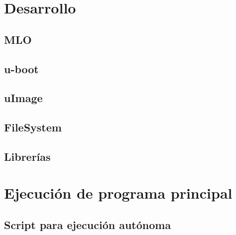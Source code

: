 \section{Desarrollo}
\subsection{MLO}
\subsection{u-boot}
\subsection{uImage}
\subsection{FileSystem}
\subsection{Librerías}
\section{Ejecución de programa principal}
\subsection{Script para ejecución autónoma}
